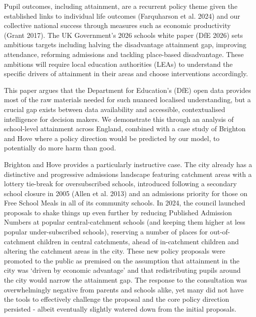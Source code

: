 \documentclass[
  12pt,
  titlepage]{article}
\begin{document}
Pupil outcomes, including attainment, are a recurrent policy theme given
the established links to individual life outcomes (Farquharson et al.
2024) and our collective national success through measures such as
economic productivity (Grant 2017). The UK Government's 2026 schools
white paper (DfE 2026) sets ambitious targets including halving the
disadvantage attainment gap, improving attendance, reforming admissions
and tackling place-based disadvantage. These ambitions will require
local education authorities (LEAs) to understand the specific drivers of
attainment in their areas and choose interventions accordingly.

This paper argues that the Department for Education's (DfE) open data
provides most of the raw materials needed for such nuanced localised
understanding, but a crucial gap exists between data availability and
accessible, contextualised intelligence for decision makers. We
demonstrate this through an analysis of school-level attainment across
England, combined with a case study of Brighton and Hove where a policy
direction would be predicted by our model, to potentially do more harm
than good.

Brighton and Hove provides a particularly instructive case. The city
already has a distinctive and progressive admissions landscape featuring
catchment areas with a lottery tie-break for oversubscribed schools,
introduced following a secondary school closure in 2005 (Allen et al.
2013) and an admissions priority for those on Free School Meals in all
of its community schools. In 2024, the council launched proposals to
shake things up even further by reducing Published Admission Numbers at
popular central-catchment schools (and keeping them higher at less
popular under-subscribed schools), reserving a number of places for
out-of-catchment children in central catchments, ahead of in-catchment
children and altering the catchment areas in the city. These new policy
proposals were promoted to the public as premised on the assumption that
attainment in the city was `driven by economic advantage' and that
redistributing pupils around the city would narrow the attainment gap.
The response to the consultation was overwhelmingly negative from
parents and schools alike, yet many did not have the tools to
effectively challenge the proposal and the core policy direction
persisted - albeit eventually slightly watered down from the initial
proposals.
\end{document}
